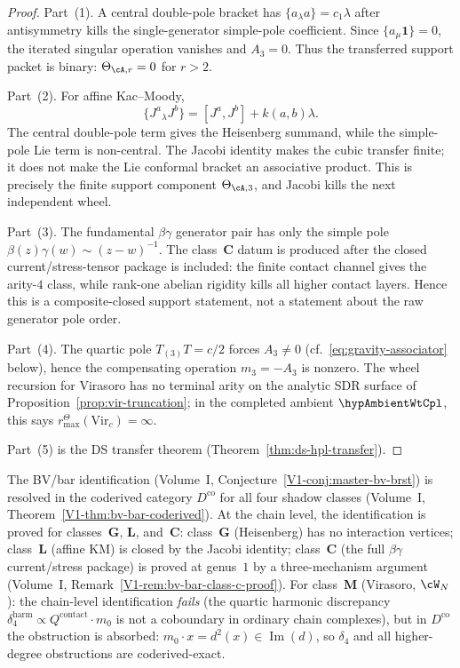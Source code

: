\begin{proof}
Part~(1). A central double-pole bracket has
$\{a{}_\lambda a\}=c_1\lambda$ after antisymmetry kills the
single-generator simple-pole coefficient. Since
$\{a{}_\mu\mathbf 1\}=0$, the iterated singular operation vanishes and
$A_3=0$.  Thus the transferred support packet is binary:
\(\Theta_{\cA,r}=0\) for \(r>2\).

Part~(2). For affine Kac--Moody,
\[
\{J^a{}_\lambda J^b\}=[J^a,J^b]+k(a,b)\lambda .
\]
The central double-pole term gives the Heisenberg summand, while the
simple-pole Lie term is non-central. The Jacobi identity makes the
cubic transfer finite; it does not make the Lie conformal bracket an
associative product.  This is precisely the finite support component
\(\Theta_{\cA,3}\), and Jacobi kills the next independent wheel.

Part~(3). The fundamental $\beta\gamma$ generator pair has only the
simple pole $\beta(z)\gamma(w)\sim (z-w)^{-1}$. The class~$\mathbf C$
datum is produced after the closed current/stress-tensor package is
included: the finite contact channel gives the arity-$4$ class, while
rank-one abelian rigidity kills all higher contact layers.  Hence this
is a composite-closed support statement, not a statement about the raw
generator pole order.

Part~(4). The quartic pole $T_{(3)}T=c/2$ forces
$A_3 \neq 0$ (cf.~\eqref{eq:gravity-associator} below), hence the
compensating operation $m_3=-A_3$ is nonzero. The wheel recursion for
Virasoro has no terminal arity on the analytic SDR surface of
Proposition~\ref{prop:vir-truncation}; in the completed ambient
\(\hypAmbientWtCpl\), this says \(r^\Theta_{\max}(\mathrm{Vir}_c)=\infty\).

Part~(5) is the DS transfer theorem
(Theorem~\ref{thm:ds-hpl-transfer}).
\end{proof}

\begin{remark}
\label{rem:bv-bar-by-class}
The BV/bar identification
(Volume~I, Conjecture~\ref{V1-conj:master-bv-brst})
is resolved in the coderived category $D^{\mathrm{co}}$ for all
four shadow classes
(Volume~I, Theorem~\ref{V1-thm:bv-bar-coderived}).
At the chain level, the identification is proved for
classes~$\mathbf{G}$, $\mathbf{L}$, and~$\mathbf{C}$:
class~$\mathbf{G}$ (Heisenberg) has no interaction vertices;
class~$\mathbf{L}$ (affine KM) is closed by the Jacobi identity;
class~$\mathbf{C}$ (the full $\beta\gamma$ current/stress package) is proved at
genus~$1$ by a three-mechanism argument
(Volume~I, Remark~\ref{V1-rem:bv-bar-class-c-proof}).
For class~$\mathbf{M}$ (Virasoro, $\cW_N$): the chain-level
identification \emph{fails} (the quartic harmonic
discrepancy $\delta_4^{\mathrm{harm}} \propto
Q^{\mathrm{contact}} \cdot m_0$ is not a coboundary in
ordinary chain complexes), but in $D^{\mathrm{co}}$ the
obstruction is absorbed: $m_0 \cdot x = d^2(x)
\in \operatorname{Im}(d)$, so $\delta_4$ and all higher-degree
obstructions are coderived-exact.
\end{remark}

